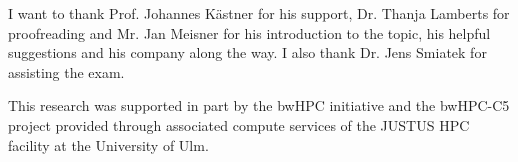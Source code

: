 I want to thank Prof. Johannes Kästner for his support, Dr. Thanja Lamberts
for proofreading and Mr. Jan Meisner for his introduction to the topic, his
helpful suggestions and his company along the way. I also thank Dr. Jens
Smiatek for assisting the exam.

This research was supported in part by the bwHPC initiative and the bwHPC-C5
project\cite{JUSTUS} provided through associated compute services of the JUSTUS
HPC facility at the University of Ulm.
% 
%

%
%

%

